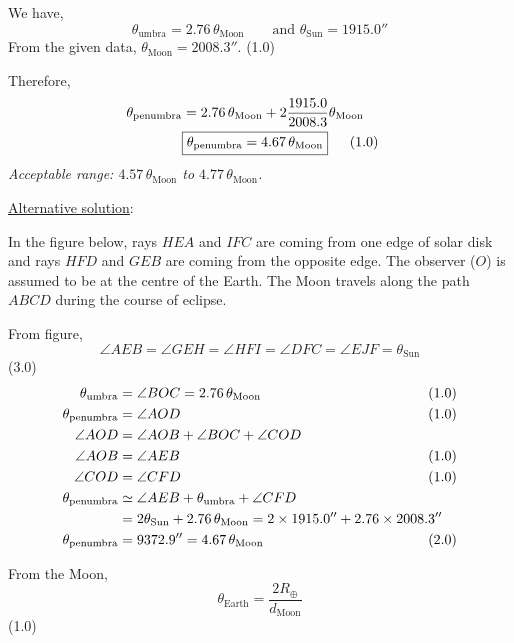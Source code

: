 \begin{description}
We have,
\[
\theta_{\mathrm{umbra}} = 2.76\,\theta_{\mathrm{Moon}}
\qquad\text{and } \theta_{\mathrm{Sun}} = 1915.0''
\]
From the given data, $\theta_{\mathrm{Moon}} = 2008.3''$. \hfill(1.0)

Therefore,
\begin{align*}
\theta_{\mathrm{penumbra}} &= 2.76\,\theta_{\mathrm{Moon}}
 + 2\frac{1915.0}{2008.3}\theta_{\mathrm{Moon}}\\
&\fbox{$\theta_{\mathrm{penumbra}} = 4.67\,\theta_{\mathrm{Moon}}$}
 & &\hspace{-2em}(1.0)
\end{align*}
\emph{Acceptable range: $4.57\,\theta_{\mathrm{Moon}}$ to $4.77\,\theta_{\mathrm{Moon}}$.}

\underline{Alternative solution}:

In the figure below, rays $HEA$ and $IFC$ are coming from one edge of solar disk and rays
$HFD$ and $GEB$ are coming from the opposite edge. The observer ($O$) is assumed to be at
the centre of the Earth. The Moon travels along the path $ABCD$ during the course of
eclipse.

From figure,
\[
\angle AEB = \angle GEH = \angle HFI = \angle DFC = \angle EJF = \theta_{\mathrm{Sun}}
\]
\hfill(3.0)
\begin{align*}
\theta_{\mathrm{umbra}} &= \angle BOC = 2.76\,\theta_{\mathrm{Moon}}
 & &\hspace{-2em}(1.0)\\
\theta_{\mathrm{penumbra}} &= \angle AOD & &\hspace{-2em}(1.0)\\
\angle AOD &= \angle AOB + \angle BOC + \angle COD\\
\angle AOB &= \angle AEB & &\hspace{-2em}(1.0)\\
\angle COD &= \angle CFD & &\hspace{-2em}(1.0)\\
\theta_{\mathrm{penumbra}} &\simeq \angle AEB + \theta_{\mathrm{umbra}} + \angle CFD\\
 &= 2\theta_{\mathrm{Sun}} + 2.76\,\theta_{\mathrm{Moon}}
 = 2\times1915.0'' + 2.76\times2008.3''\\
\theta_{\mathrm{penumbra}} &= 9372.9'' = 4.67\,\theta_{\mathrm{Moon}}
 & &\hspace{-2em}(2.0)
\end{align*}

\item[(D2.6)]
From the Moon,
\[
\theta_{\mathrm{Earth}} = \frac{2R_\oplus}{d_{\mathrm{Moon}}}
\]
\hfill(1.0)


\end{description}
